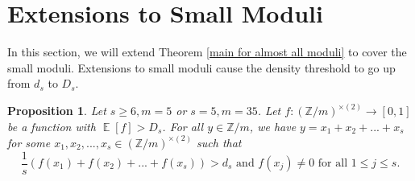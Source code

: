 \documentclass[11pt]{amsart}
\theoremstyle{plain} %
\newtheorem{prop}[thm]{Proposition}
\theoremstyle{remark}
\numberwithin{equation}{section}
\newcommand{\E}{\mathop{\mathbb{E}}}
\newcommand{\Z}{\mathbb{Z}}
\begin{document}
\section{Extensions to Small Moduli}\label{sec: small moduli}

In this section, we will extend Theorem \ref{main for almost all moduli} to cover the small moduli. Extensions to small moduli cause the density threshold to go up from $d_s$ to $D_s$.

\begin{prop}\label{main for small moduli}
    Let $s\geq 6, m=5$ or $s=5, m=35$. Let $f:(\Z/m)^{\times(2)}\longrightarrow[0,1]$ be a function with $\E[f]>D_s$. For all $y\in \Z/m$, we have $y=x_1+x_2+...+x_s$ for some $x_1,x_2,...,x_s\in (\Z/m)^{\times(2)}$ such that
    \begin{equation*}
        \text{$\frac{1}{s}(f(x_1)+f(x_2)+...+f(x_s))>d_s$ and $f(x_j)\neq 0$ for all $1\leq j \leq s$.}
    \end{equation*}
\end{prop}
\end{document}
